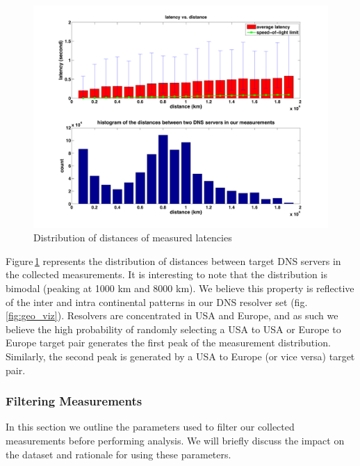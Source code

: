 \begin{figure}[!tbh]
  \centering
  \includegraphics[width=\linewidth]{../figs/King_distance_distrbution.pdf}
  \vspace{-1em}
  \caption{Distribution of distances of measured latencies}
  \label{fig:latency_distance_distribution}
\end{figure}

Figure\,\ref{fig:latency_distance_distribution} represents the distribution of distances between target DNS servers in the collected measurements. It is interesting to note that the distribution is bimodal (peaking at 1000 km and 8000 km). We believe this property is reflective of the inter and intra continental patterns in our DNS resolver set (fig.\,\ref{fig:geo_viz}). Resolvers are concentrated in USA and Europe, and as such we believe the high probability of randomly selecting a USA to USA or Europe to Europe target pair generates the first peak of the measurement distribution. Similarly, the second peak is generated by a USA to Europe (or vice versa) target pair.

\subsubsection{Filtering Measurements}
In this section we outline the parameters used to filter our collected measurements before performing analysis. We will briefly discuss the impact on the dataset and rationale for using these parameters.

